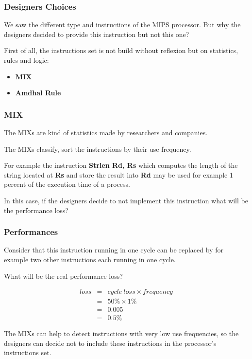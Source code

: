 
\begin{frame}
  \frametitle{Designers Choices}

  We saw the different type and instructions of the MIPS processor. But
  why the designers decided to provide this instruction but not this one?

  \-

  First of all, the instructions set is not build without reflexion
  but on statistics, rules and logic:

  \begin{itemize}
    \item
      \textbf{MIX}
    \item
      \textbf{Amdhal Rule}
  \end{itemize}
\end{frame}


\begin{frame}
  \frametitle{MIX}

  The MIXs are kind of statistics made by researchers and companies.

  \-

  The MIXs classify, sort the instructions by their use frequency.

  \-

  For example the instruction \textbf{Strlen Rd, Rs} which computes
  the length of the string located at \textbf{Rs} and store the result
  into \textbf{Rd} may be used for example 1 percent of the execution
  time of a process.

  \-

  In this case, if the designers decide to not implement this instruction
  what will be the performance loss?
\end{frame}


\begin{frame}
  \frametitle{Performances}

  Consider that this instruction running in one cycle can be replaced
  by for example two other instructions each running in one cycle.

  \-

  What will be the real performance loss?

  \-

  \begin{eqnarray*}
    loss & = & cycle~loss \times frequency \\
         & = & 50\% \times 1\% \\
         & = & 0.005 \\
         & = & 0.5\%
  \end{eqnarray*}

  \-

  The MIXs can help to detect instructions with very low use frequencies, so
  the designers can decide not to include these instructions in the
  processor's instructions set.
\end{frame}

